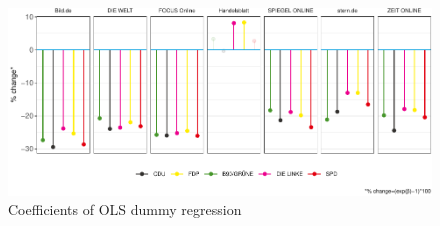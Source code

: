 \documentclass[
]{article}
\begin{document}
\begin{figure}

{\centering \includegraphics[width=1\linewidth]{main_text_files/figure-latex/Plot coefficients - simple dummy-1} 

}

\caption{Coefficients of OLS dummy regression \label{fig:coeff_ols_dummy}}\label{fig:Plot coefficients - simple dummy}
\end{figure}
\end{document}
